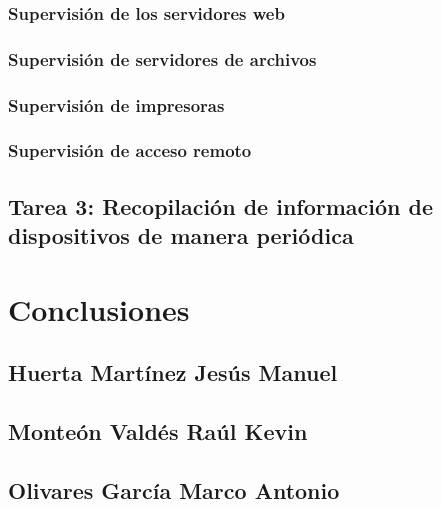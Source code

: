 \documentclass[oneside,10pt]{book}
\begin{document}
\subsection{Supervisión de los servidores web}

\subsection{Supervisión de servidores de archivos}

\subsection{Supervisión de impresoras}

\subsection{Supervisión de acceso remoto}

\section{Tarea 3: Recopilación de información de dispositivos de manera periódica}


\chapter{Conclusiones}

\section{Huerta Martínez Jesús Manuel}

\section{Monteón Valdés Raúl Kevin}

\section{Olivares García Marco Antonio}


\end{document}
